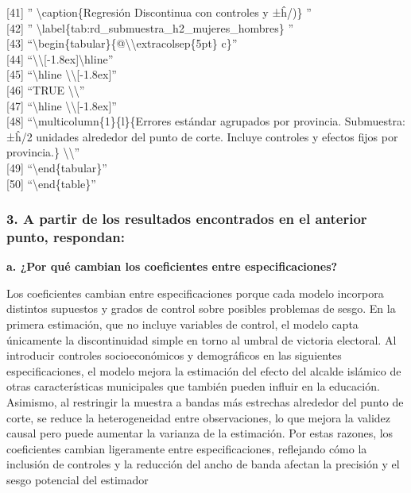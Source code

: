 \documentclass[
]{article}
\begin{document}
{[}41{]} '' \textbackslash caption\{Regresión Discontinua con controles
y ±ĥ/)\} ''\\
{[}42{]} ''
\textbackslash label\{tab:rd\_submuestra\_h2\_mujeres\_hombres\} ''\\
{[}43{]}
``\textbackslash begin\{tabular\}\{@\textbackslash\textbackslash extracolsep\{5pt\}
c\}''\\
{[}44{]}
``\textbackslash\textbackslash{[}-1.8ex{]}\textbackslash hline''\\
{[}45{]} ``\textbackslash hline
\textbackslash\textbackslash{[}-1.8ex{]}''\\
{[}46{]} ``TRUE \textbackslash\textbackslash{}''\\
{[}47{]} ``\textbackslash hline
\textbackslash\textbackslash{[}-1.8ex{]}''\\
{[}48{]} ``\textbackslash multicolumn\{1\}\{l\}\{Errores estándar
agrupados por provincia. Submuestra: ±ĥ/2 unidades alrededor del punto
de corte. Incluye controles y efectos fijos por provincia.\}
\textbackslash\textbackslash{}''\\
{[}49{]} ``\textbackslash end\{tabular\}''\\
{[}50{]} ``\textbackslash end\{table\}''

\newpage

\subsubsection{3. A partir de los resultados encontrados en el anterior
punto,
respondan:}\label{a-partir-de-los-resultados-encontrados-en-el-anterior-punto-respondan}

\textbf{a. ¿Por qué cambian los coeficientes entre especificaciones?}

Los coeficientes cambian entre especificaciones porque cada modelo
incorpora distintos supuestos y grados de control sobre posibles
problemas de sesgo. En la primera estimación, que no incluye variables
de control, el modelo capta únicamente la discontinuidad simple en torno
al umbral de victoria electoral. Al introducir controles socioeconómicos
y demográficos en las siguientes especificaciones, el modelo mejora la
estimación del efecto del alcalde islámico de otras características
municipales que también pueden influir en la educación. Asimismo, al
restringir la muestra a bandas más estrechas alrededor del punto de
corte, se reduce la heterogeneidad entre observaciones, lo que mejora la
validez causal pero puede aumentar la varianza de la estimación. Por
estas razones, los coeficientes cambian ligeramente entre
especificaciones, reflejando cómo la inclusión de controles y la
reducción del ancho de banda afectan la precisión y el sesgo potencial
del estimador
\end{document}
